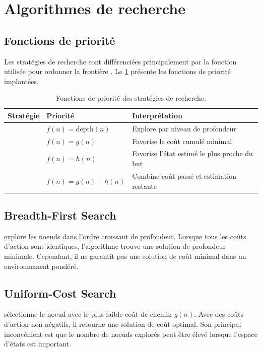 \section{Algorithmes de recherche}

\subsection{Fonctions de priorité}

Les stratégies de recherche sont différenciées principalement par la fonction
utilisée pour ordonner la frontière . Le \cref{tab:priorites}
présente les fonctions de priorité implantées.

\begin{table}[H]
\centering
\caption{Fonctions de priorité des stratégies de recherche.}
\label{tab:priorites}
\begin{tabular}{lll}
\toprule
\textbf{Stratégie} & \textbf{Priorité} & \textbf{Interprétation} \\
\midrule
\BFS{} & $f(n)=\mathrm{depth}(n)$ & Explore par niveau de profondeur \\
\UCS{} & $f(n)=g(n)$ & Favorise le coût cumulé minimal \\
\Greedy{} & $f(n)=h(n)$ & Favorise l'état estimé le plus proche du but \\
\AStar{} & $f(n)=g(n)+h(n)$ & Combine coût passé et estimation restante \\
\bottomrule
\end{tabular}
\end{table}

\subsection{Breadth-First Search}

\BFS{} explore les noeuds dans l'ordre croissant de profondeur. Lorsque tous
les coûts d'action sont identiques, l'algorithme trouve une solution de
profondeur minimale. Cependant, il ne garantit pas une solution de coût minimal
dans un environnement pondéré.

\subsection{Uniform-Cost Search}

\UCS{} sélectionne le noeud avec le plus faible coût de chemin $g(n)$. Avec
des coûts d'action non négatifs, il retourne une solution de coût optimal.
Son principal inconvénient est que le nombre de noeuds explorés peut être élevé
lorsque l'espace d'états est important.

